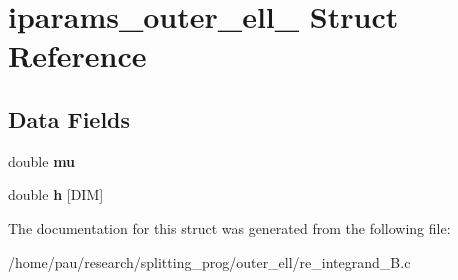 \hypertarget{structiparams__outer__ell__1}{
\section{iparams\_\-outer\_\-ell\_ Struct Reference}
\label{structiparams__outer__ell__1}
}
\subsection*{Data Fields}
\begin{DoxyCompactItemize}
\item 
\hypertarget{structiparams__outer__ell__1_a74577585cf12d1712ab9c57616d49205}{
double {\bfseries mu}}
\label{structiparams__outer__ell__1_a74577585cf12d1712ab9c57616d49205}

\item 
\hypertarget{structiparams__outer__ell__1_a95177a5a22dcb6abff5fa526bf316e6e}{
double {\bfseries h} \mbox{[}DIM\mbox{]}}
\label{structiparams__outer__ell__1_a95177a5a22dcb6abff5fa526bf316e6e}

\end{DoxyCompactItemize}


The documentation for this struct was generated from the following file:\begin{DoxyCompactItemize}
\item 
/home/pau/research/splitting\_\-prog/outer\_\-ell/re\_\-integrand\_\-B.c\end{DoxyCompactItemize}

